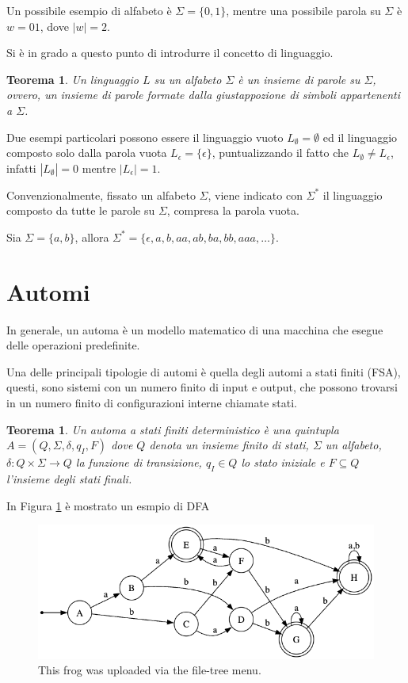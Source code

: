 \documentclass[a4paper,12pt]{report}
\newtheorem{lang}{Teorema}[chapter]
\newtheorem{dfa}{Teorema}[chapter]
\begin{document}
Un possibile esempio di alfabeto è $\Sigma = \{0, 1\}$, mentre una possibile parola su $\Sigma$ è $w = 01$, dove $|w| = 2$.

Si è in grado a questo punto di introdurre il concetto di linguaggio.

\begin{lang}\label{th:lang}
  Un linguaggio $L$ su un alfabeto $\Sigma$ è un insieme di parole su $\Sigma$, ovvero, un insieme di parole formate dalla giustappozione di simboli appartenenti a $\Sigma$.
\end{lang}

Due esempi particolari possono essere il linguaggio vuoto $L_\emptyset = \emptyset$ ed il linguaggio composto solo dalla
parola vuota $L_\epsilon = \{\epsilon\}$, puntualizzando il fatto che $L_\emptyset \neq L_\epsilon$,
infatti $|L_\emptyset| = 0$ mentre $|L_\epsilon| = 1$.

Convenzionalmente, fissato un alfabeto $\Sigma$, viene indicato con $\Sigma^*$ il linguaggio composto da tutte
le parole su $\Sigma$, compresa la parola vuota.

Sia $\Sigma = \{a, b\}$, allora $\Sigma^* = \{\epsilon, a, b, aa, ab, ba, bb, aaa, \dots\}$.

\section{Automi}

In generale, un automa è un modello matematico di una macchina che esegue delle operazioni predefinite.

Una delle principali tipologie di automi è quella degli automi a stati finiti (FSA), questi, sono sistemi
con un numero finito di input e output, che possono trovarsi in un numero finito di configurazioni interne chiamate stati.

\begin{dfa}
  \label{th:dfa}
  Un automa a stati finiti deterministico è una quintupla \\
  $A = (Q, \Sigma, \delta, q_I, F)$ dove $Q$ denota un insieme finito di stati, $\Sigma$ un alfabeto, \\
  $\delta: Q \times \Sigma \rightarrow Q$ la funzione di transizione, $q_I \in Q$ lo stato iniziale e $F \subseteq Q$ l'insieme degli stati finali.
\end{dfa}

In Figura \ref{fig:dfa} è mostrato un esmpio di DFA

\begin{figure}[!htb]
  \centering
  \includegraphics[width=0.7\linewidth]{dfa.png}
  \caption{\label{fig:dfa}This frog was uploaded via the file-tree menu.}
\end{figure}
\end{document}
